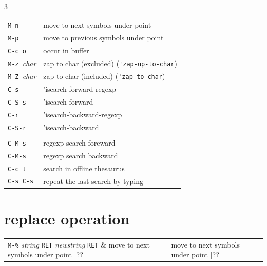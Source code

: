 \documentclass[11pt,landscape,a4paper]{article}
\begin{document}
\begin{multicols}{3}
\begin{tabular}{@{}ll@{}}
	{\color{cgreen}\verb|M-n|} 		& move to next symbols under point\\
	{\color{cgreen}\verb|M-p|} 		& move to previous symbols under point\\
	{\color{darkred}\verb|C-c o|} 			& occur in buffer\\
	{\color{cblue}\verb|M-z |\emph{char}} 	& zap to char (excluded)  (\verb|'zap-up-to-char|)\\
	{\color{cblue}\verb|M-Z |\emph{char}}	& zap to char (included)  (\verb|'zap-to-char|)\\
	{\color{cblue}\verb|C-s|} 		& 'isearch-forward-regexp\\  %
	{\color{cblue}\verb|C-S-s|} 	& 'isearch-forward\\         %
	{\color{cblue}\verb|C-r|} 		& 'isearch-backward-regexp\\ %
	{\color{cblue}\verb|C-S-r|} 	& 'isearch-backward\\        %
	\\
	{\verb|C-M-s|} 	& regexp search foreward\\
	{\verb|C-M-s|} 	& regexp search backward\\
	{\color{cgreen}\verb|C-c t|} 			& search in offline thesaurus\\ 
	\verb|C-s C-s|& repeat the last search by typing \\
\end{tabular}

\section{replace operation}

\begin{tabular}{@{}ll@{}}
	\verb|M-%| \textit{string} \verb|RET| \textit{newstring} \verb|RET| 		& move to next symbols under point [??]\\
\end{tabular}



\end{multicols}
\end{document}
